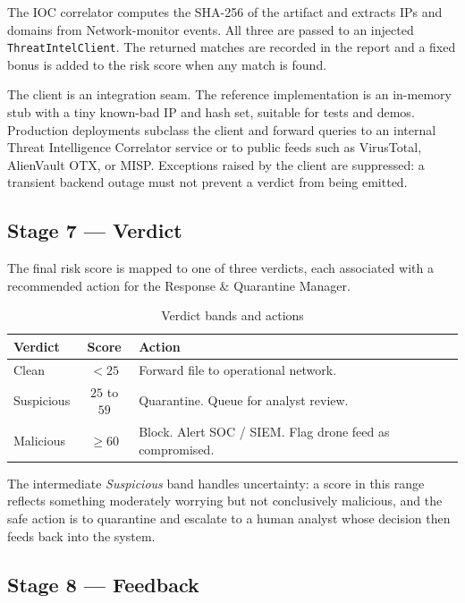 \documentclass[12pt, a4paper]{report}
\begin{document}
The IOC correlator computes the SHA-256 of the artifact and extracts
IPs and domains from Network-monitor events. All three are passed to
an injected \texttt{ThreatIntelClient}. The returned matches are
recorded in the report and a fixed bonus is added to the risk score
when any match is found.

The client is an integration seam. The reference implementation is an
in-memory stub with a tiny known-bad IP and hash set, suitable for
tests and demos. Production deployments subclass the client and
forward queries to an internal Threat Intelligence Correlator service
or to public feeds such as VirusTotal, AlienVault OTX, or MISP.
Exceptions raised by the client are suppressed: a transient backend
outage must not prevent a verdict from being emitted.

\subsection{Stage 7 --- Verdict}

The final risk score is mapped to one of three verdicts, each
associated with a recommended action for the Response \& Quarantine
Manager.

\begin{table}[H]
\centering
\caption{Verdict bands and actions}
\label{tab:sb_verdicts}
\begin{tabular}{|l|c|p{7cm}|}
\hline
\textbf{Verdict} & \textbf{Score} & \textbf{Action} \\
\hline
Clean & $< 25$ & Forward file to operational network. \\
\hline
Suspicious & $25$ to $59$ & Quarantine. Queue for analyst review. \\
\hline
Malicious & $\geq 60$ & Block. Alert SOC / SIEM. Flag drone feed as compromised. \\
\hline
\end{tabular}
\end{table}

The intermediate \emph{Suspicious} band handles uncertainty: a score
in this range reflects something moderately worrying but not
conclusively malicious, and the safe action is to quarantine and
escalate to a human analyst whose decision then feeds back into the
system.

\subsection{Stage 8 --- Feedback}
\end{document}
